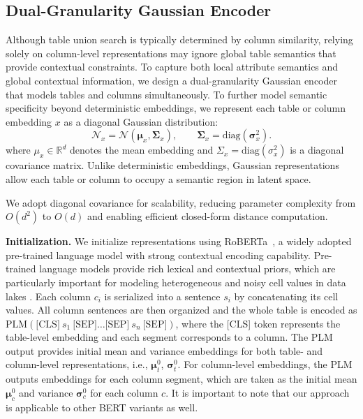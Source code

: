 \subsection{Dual-Granularity Gaussian Encoder}
\label{sub_sec_dul}
Although table union search is typically determined by column similarity, relying solely on column-level representations may ignore global table semantics that provide contextual constraints. To capture both local attribute semantics and global contextual information, we design a dual-granularity Gaussian encoder that models tables and columns simultaneously. To further model semantic specificity beyond deterministic embeddings, we represent each table or column embedding \(x\) as a diagonal Gaussian distribution:
\begin{equation}
\label{eq_gaussian_embedding}
    \mathcal{N}_x
    =
    \mathcal{N}
    \left(
    \mathbf{\mu}_x,
    \mathbf{\Sigma}_x
    \right),
    \qquad
    \mathbf{\Sigma}_x
    =
    \mathrm{diag}(\mathbf{\sigma}_x^2).
\end{equation}
where $\mu_x \in \mathbb{R}^d$ denotes the mean embedding
and $\Sigma_x = \mathrm{diag}(\sigma_x^2)$ is a diagonal covariance matrix. Unlike deterministic embeddings, Gaussian representations allow each table or column to occupy a semantic region in latent space.

We adopt diagonal covariance for scalability, reducing parameter complexity from \(O(d^2)\) to \(O(d)\) and enabling efficient closed-form distance computation.

\noindent\textbf{Initialization.} 
We initialize representations using RoBERTa~\cite{liu2019roberta}, a widely adopted pre-trained language model with strong contextual encoding capability. Pre-trained language models provide rich lexical and contextual priors, which are particularly important for modeling heterogeneous and noisy cell values in data lakes {\cite{yin2020tabert,deng2022turl}}. Each column \(c_i\) is serialized into a sentence \(s_i\) by concatenating its cell values. All column sentences are then organized and the whole table is encoded as $\text{PLM}(\text{[CLS]}\ s_1\ \text{[SEP]} \dots \text{[SEP]}\ s_n \ \text{[SEP]})$, 
where the [CLS] token represents the table-level embedding and each segment corresponds to a column. The PLM output provides initial mean and variance embeddings for both table- and column-level representations, i.e., $\mathbf{\mu}_{t}^0$, $\mathbf{\sigma}_t^0$. For column-level embeddings, the PLM outputs embeddings for each column segment, which are taken as the initial mean $\mathbf{\mu}_{c}^0$ and variance $\mathbf{\sigma}_c^0$ for each column $c$. It is important to note that our approach is applicable to other BERT variants as well. 

